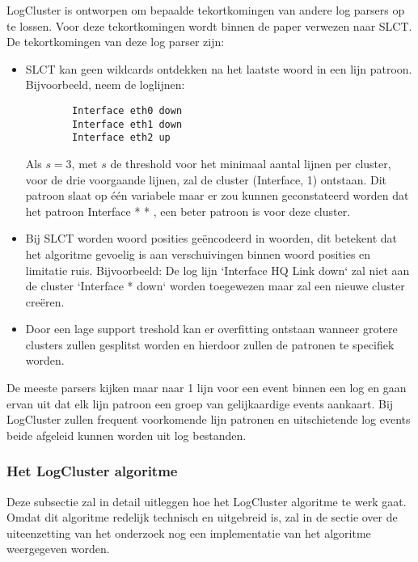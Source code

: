 LogCluster is ontworpen om bepaalde tekortkomingen van andere log parsers op te lossen. Voor deze tekortkomingen wordt binnen de paper verwezen naar SLCT. De tekortkomingen van deze log parser zijn:
\begin{itemize}
    \item SLCT kan geen wildcards ontdekken na het laatste woord in een lijn patroon. Bijvoorbeeld, neem de loglijnen:
    
    \begin{verbatim}
        Interface eth0 down
        Interface eth1 down
        Interface eth2 up 
    \end{verbatim}

    Als $s = 3$, met $s$ de threshold voor het minimaal aantal lijnen per cluster, voor de drie voorgaande lijnen, zal de cluster {(Interface, 1)} ontstaan. Dit patroon slaat op één variabele maar er zou kunnen geconstateerd worden dat het patroon Interface * * , een beter patroon is voor deze cluster.\\
    
    \item Bij SLCT worden woord posities geëncodeerd in woorden, dit betekent dat het algoritme gevoelig is aan verschuivingen binnen woord posities en limitatie ruis. Bijvoorbeeld: De log lijn `Interface HQ Link down` zal niet aan de cluster `Interface * down` worden toegewezen maar zal een nieuwe cluster creëren.\\
    
    \item Door een lage support treshold kan er overfitting ontstaan wanneer grotere clusters zullen gesplitst worden en hierdoor zullen de patronen te specifiek worden.
\end{itemize} 
De meeste parsers kijken maar naar 1 lijn voor een event binnen een log en gaan ervan uit dat elk lijn patroon een groep van gelijkaardige events aankaart. Bij LogCluster zullen frequent voorkomende lijn patronen en uitschietende log events beide afgeleid kunnen worden uit log bestanden. 

\subsubsection{Het LogCluster algoritme}
Deze subsectie zal in detail uitleggen hoe het LogCluster algoritme te werk gaat. Omdat dit algoritme redelijk technisch en uitgebreid is, zal in de sectie over de uiteenzetting van het onderzoek nog een implementatie van het algoritme weergegeven worden.

